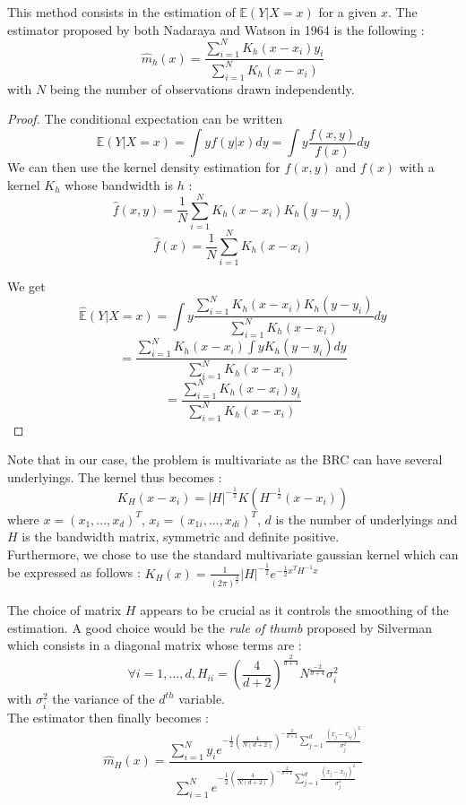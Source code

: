 \documentclass[a4paper,11pt,english]{book}
\begin{document}
This method consists in the estimation of $\mathbb{E}(Y|X=x)$ for a given $x$. The estimator proposed by both Nadaraya\cite{nadaraya1964estimating} and Watson\cite{watson1964smooth} in 1964 is the following : $$\hat{m}_{h}(x)=\frac{\sum_{i=1}^{N}K_{h}(x-x_{i})y_{i}}{\sum_{i=1}^{N}K_{h}(x-x_{i})}$$
with $N$ being the number of observations drawn independently.\\

\begin{proof}
The conditional expectation can be written $$\mathbb{E}(Y|X=x)=\int yf(y|x)dy = \int y\frac{f(x,y)}{f(x)}dy$$
We can then use the kernel density estimation for $f(x,y)$ and $f(x)$ with a kernel $K_{h}$ whose bandwidth is $h$ : $$\hat{f}(x,y) = \frac{1}{N}\sum_{i=1}^{N}K_{h}(x-x_{i})K_{h}(y-y_{i})$$
$$\hat{f}(x) = \frac{1}{N}\sum_{i=1}^{N}K_{h}(x-x_{i})$$

We get $$\hat{\mathbb{E}}(Y|X=x) = \int y\frac{\sum_{i=1}^{N}K_{h}(x-x_{i})K_{h}(y-y_{i})}{\sum_{i=1}^{N}K_{h}(x-x_{i})}dy$$
$$=\frac{\sum_{i=1}^{N}K_{h}(x-x_{i})\int y K_{h}(y-y_{i})dy }{\sum_{i=1}^{N}K_{h}(x-x_{i})}$$
$$=\frac{\sum_{i=1}^{N}K_{h}(x-x_{i})y_{i}}{\sum_{i=1}^{N}K_{h}(x-x_{i})}$$
\end{proof}

Note that in our case, the problem is multivariate as the BRC can have several underlyings. The kernel thus becomes : $$K_{H}(x-x_{i}) = |H|^{-\frac{1}{2}}K(H^{-\frac{1}{2}}(x-x_{i}))$$
where $x=(x_{1},...,x_{d})^{T}$, $x_{i}=(x_{1i},...,x_{di})^{T}$, $d$ is the number of underlyings and $H$ is the bandwidth matrix, symmetric and definite positive.\\

Furthermore, we chose to use the standard multivariate gaussian kernel which can be expressed as follows :
$K_{H}(x)=\frac{1}{(2\pi)^{\frac{d}{2}}}|H|^{-\frac{1}{2}}e^{-\frac{1}{2}x^{T}H^{-1}x}$

The choice of matrix $H$ appears to be crucial as it controls the smoothing of the estimation. A good choice would be the \textit{rule of thumb} proposed by Silverman\cite{silverman1986density} which consists in a diagonal matrix whose terms are : $$\forall i=1,...,d, H_{ii} = (\frac{4}{d+2})^{\frac{2}{d+4}}N^{\frac{-2}{d+4}}\sigma_{i}^{2}$$
with $\sigma_{i}^{2}$ the variance of the $d^{th}$ variable.\\

The estimator then finally becomes :
$$\hat{m}_{H}(x)= \frac{\sum_{i=1}^{N}y_{i}e^{-\frac{1}{2}(\frac{4}{N(d+2)})^{-\frac{2}{d+4}}\sum_{j=1}^{d}\frac{(x_{j}-x_{ij})^{2}}{\sigma_{j}^{2}}}}{\sum_{i=1}^{N}e^{-\frac{1}{2}(\frac{4}{N(d+2)})^{-\frac{2}{d+4}}\sum_{j=1}^{d}\frac{(x_{j}-x_{ij})^{2}}{\sigma_{j}^{2}}}}$$
\end{document}

